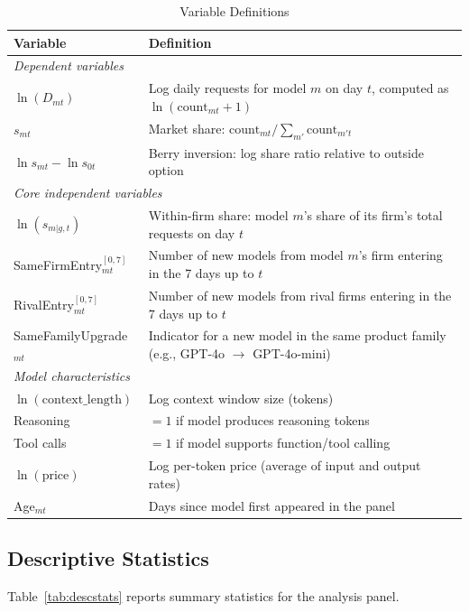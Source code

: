 \documentclass[11pt, a4paper]{article}
\begin{document}
\begin{table}[H]
\centering
\caption{Variable Definitions}
\label{tab:variables}
\begin{threeparttable}
\begin{tabular}{lp{10cm}}
\toprule
Variable & Definition \\
\midrule
\multicolumn{2}{l}{\textit{Dependent variables}} \\
$\ln(D_{mt})$ & Log daily requests for model $m$ on day $t$, computed as $\ln(\text{count}_{mt} + 1)$ \\
$s_{mt}$ & Market share: $\text{count}_{mt} / \sum_{m'} \text{count}_{m't}$ \\
$\ln s_{mt} - \ln s_{0t}$ & Berry inversion: log share ratio relative to outside option \\[4pt]
\multicolumn{2}{l}{\textit{Core independent variables}} \\
$\ln(s_{m|g,t})$ & Within-firm share: model $m$'s share of its firm's total requests on day $t$ \\
SameFirmEntry$_{mt}^{[0,7]}$ & Number of new models from model $m$'s firm entering in the 7 days up to $t$ \\
RivalEntry$_{mt}^{[0,7]}$ & Number of new models from rival firms entering in the 7 days up to $t$ \\
SameFamilyUpgrade$_{mt}$ & Indicator for a new model in the same product family (e.g., GPT-4o $\to$ GPT-4o-mini) \\[4pt]
\multicolumn{2}{l}{\textit{Model characteristics}} \\
$\ln(\text{context\_length})$ & Log context window size (tokens) \\
Reasoning & $= 1$ if model produces reasoning tokens \\
Tool calls & $= 1$ if model supports function/tool calling \\
$\ln(\text{price})$ & Log per-token price (average of input and output rates) \\
Age$_{mt}$ & Days since model first appeared in the panel \\
\bottomrule
\end{tabular}
\end{threeparttable}
\end{table}

\subsection{Descriptive Statistics}

Table~\ref{tab:descstats} reports summary statistics for the analysis panel.
\end{document}
